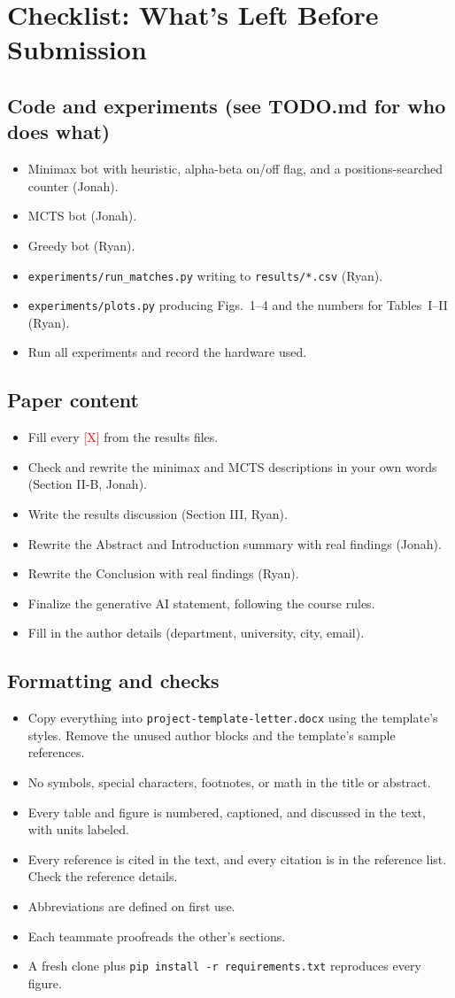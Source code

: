 \documentclass[10pt,twocolumn,letterpaper]{article}
\newcommand{\X}{\textcolor{red}{[X]}}
\begin{document}
\onecolumn
\section*{Checklist: What's Left Before Submission}
\newcommand{\task}{\item[$\square$]}
\newcommand{\done}{\item[$\boxtimes$]}

\subsection*{Code and experiments (see TODO.md for who does what)}
\begin{itemize}[nosep]
  \done Minimax bot with heuristic, alpha-beta on/off flag, and a positions-searched counter (Jonah).
  \done MCTS bot (Jonah).
  \task Greedy bot (Ryan).
  \task \texttt{experiments/run\_matches.py} writing to \texttt{results/*.csv} (Ryan).
  \task \texttt{experiments/plots.py} producing Figs.~1--4 and the numbers for Tables~I--II (Ryan).
  \task Run all experiments and record the hardware used.
\end{itemize}

\subsection*{Paper content}
\begin{itemize}[nosep]
  \task Fill every \X{} from the results files.
  \task Check and rewrite the minimax and MCTS descriptions in your own words (Section II-B, Jonah).
  \task Write the results discussion (Section III, Ryan).
  \task Rewrite the Abstract and Introduction summary with real findings (Jonah).
  \task Rewrite the Conclusion with real findings (Ryan).
  \task Finalize the generative AI statement, following the course rules.
  \task Fill in the author details (department, university, city, email).
\end{itemize}

\subsection*{Formatting and checks}
\begin{itemize}[nosep]
  \task Copy everything into \texttt{project-template-letter.docx} using the template's
        styles. Remove the unused author blocks and the template's sample references.
  \task No symbols, special characters, footnotes, or math in the title or abstract.
  \task Every table and figure is numbered, captioned, and discussed in the text, with
        units labeled.
  \task Every reference is cited in the text, and every citation is in the reference list.
        Check the reference details.
  \task Abbreviations are defined on first use.
  \task Each teammate proofreads the other's sections.
  \task A fresh clone plus \texttt{pip install -r requirements.txt} reproduces every figure.
\end{itemize}
\end{document}
